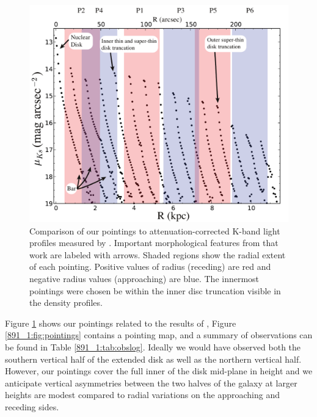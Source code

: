 \begin{figure}
  \centering
  \includegraphics[width=0.8\columnwidth]{891_1/figs/ASR_pointings.pdf}
  \caption[\GP pointings compared to known features in NGC
  891]{\label{891_1:fig:ASR_comp}\fixspacing Comparison of our \GP pointings
    to attenuation-corrected K-band light profiles measured by
    \citet{Schechtman-Rook13}. Important morphological features from
    that work are labeled with arrows. Shaded regions show the radial
    extent of each \GP pointing. Positive values of radius (receding)
    are red and negative radius values (approaching) are blue. The
    innermost \GP pointings were chosen be within the inner disc
    truncation visible in the density profiles.}
\end{figure}

Figure \ref{891_1:fig:ASR_comp} shows our \GP pointings related to the
results of \citet{Schechtman-Rook13}, Figure \ref{891_1:fig:pointings}
contains a pointing map, and a summary of observations can be found in
Table \ref{891_1:tab:obslog}. Ideally we would have observed both the
southern vertical half of the extended disk as well as the northern
vertical half. However, our pointings cover the full inner
 of the disk mid-plane in height and we anticipate
vertical asymmetries between the two halves of the galaxy at larger
heights are modest compared to radial variations on the approaching
and receding sides.

